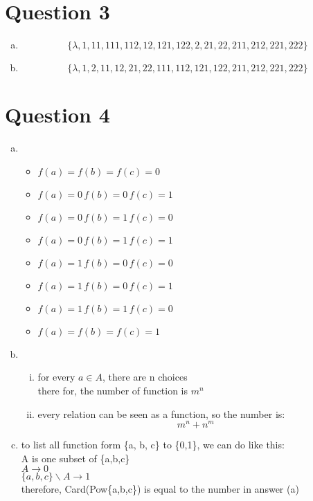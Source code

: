 \documentclass[11pt, a4paper]{article}
\begin{document}
\section*{Question 3}
\begin{enumerate}[(a)]

	\item
	$$\{ \lambda, 1, 11, 111, 112, 12, 121, 122, 2, 21, 22, 211, 212, 221, 222 \}$$
	\item
	$$\{ \lambda, 1, 2, 11, 12, 21, 22, 111, 112, 121, 122, 211, 212, 221, 222 \}$$
\end{enumerate}

\section*{Question 4}
\begin{enumerate}[(a)]
	\item
	\begin{itemize}
		\item 
		$ f(a) = f(b) = f(c) = 0$
		\item
		$ f(a) = 0 \, f(b) = 0 \, f(c) = 1$
		\item
		$ f(a) = 0 \, f(b) = 1 \, f(c) = 0$
		\item
		$ f(a) = 0 \, f(b) = 1 \, f(c) = 1$
		\item
		$ f(a) = 1 \, f(b) = 0 \, f(c) = 0$
		\item
		$ f(a) = 1 \, f(b) = 0 \, f(c) = 1$
		\item
		$ f(a) = 1 \, f(b) = 1 \, f(c) = 0$
		\item 
		$ f(a) = f(b) = f(c) = 1$
	\end{itemize}
	\item \
	\begin{enumerate}[(i)]
		\item
		for every $a \in A$, there are n choices\\
		there for, the number of function is $m^n$
		\item
		every relation can be seen as a function, so the number is:\
		$$ m^n + n^m $$
	\end{enumerate}
	\item 
	to list all function form \{a, b, c\} to \{0,1\}, we can do like this: \\
	A is one subset of \{a,b,c\} \\
	$ A \rightarrow 0 $ \\
	$ \{a,b,c\} \backslash A \rightarrow 1 $ \\
	therefore, Card(Pow\{a,b,c\}) is equal to the number in answer (a)

\end{enumerate}
\end{document}
